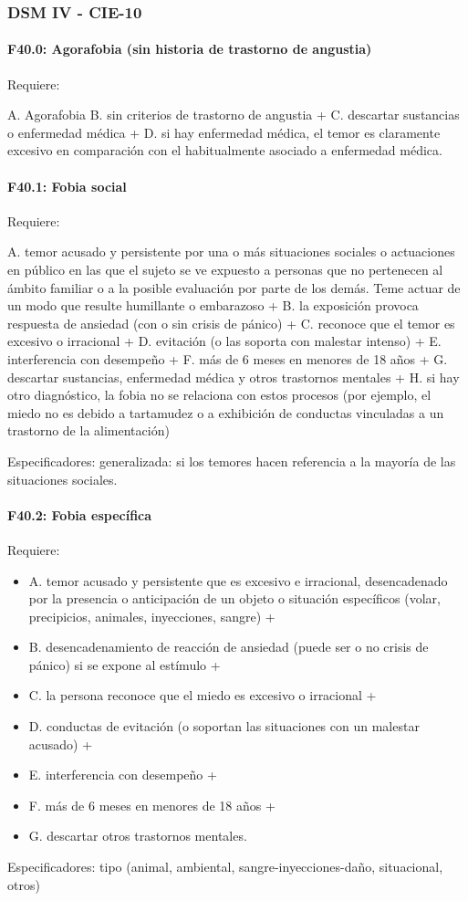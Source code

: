 \subsubsection*{DSM IV - CIE-10}
\paragraph{F40.0: Agorafobia (sin historia de trastorno de angustia)}
Requiere:

A. Agorafobia
B. sin criterios de trastorno de angustia +
C. descartar sustancias o enfermedad médica +
D. si hay enfermedad médica, el temor es claramente excesivo en comparación con el habitualmente asociado a enfermedad médica.

\paragraph{F40.1: Fobia social}
Requiere:

A. temor acusado y persistente por una o más situaciones sociales o actuaciones en público en las que el sujeto se ve expuesto a personas que no pertenecen al ámbito familiar o a la posible evaluación por parte de los demás. Teme actuar de un modo que resulte humillante o embarazoso +
B. la exposición provoca respuesta de ansiedad (con o sin crisis de pánico) +
C. reconoce que el temor es excesivo o irracional +
D. evitación (o las soporta con malestar intenso) +
E. interferencia con desempeño +
F. más de 6 meses en menores de 18 años +
G. descartar sustancias, enfermedad médica y otros trastornos mentales +
H. si hay otro diagnóstico, la fobia no se relaciona con estos procesos (por ejemplo, el miedo no es debido a tartamudez o a exhibición de conductas vinculadas a un trastorno de la alimentación)

Especificadores: generalizada: si los temores hacen referencia a la mayoría de las situaciones sociales.

\paragraph{F40.2: Fobia específica}
Requiere:
\begin{itemize}
	\item A. temor acusado y persistente que es excesivo e irracional, desencadenado por la presencia o anticipación de un objeto o situación específicos (volar, precipicios, animales, inyecciones, sangre) +
	\item B. desencadenamiento de reacción de ansiedad (puede ser o no crisis de pánico) si se expone al estímulo +
	\item C. la persona reconoce que el miedo es excesivo o irracional +
	\item D. conductas de evitación (o soportan las situaciones con un malestar acusado) +
	\item E. interferencia con desempeño +
	\item F. más de 6 meses en menores de 18 años +
	\item G. descartar otros trastornos mentales.
\end{itemize}
Especificadores: tipo (animal, ambiental, sangre-inyecciones-daño, situacional, otros)
